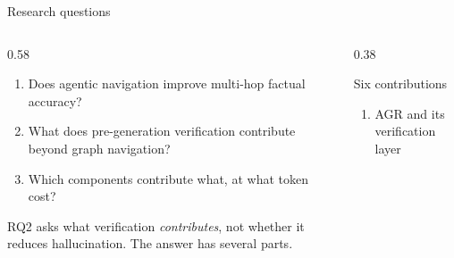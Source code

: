 \begin{frame}{Research questions}
  \bodyshift{2.75pt}
  \begin{columns}[T]
    \begin{column}{0.58\textwidth}
      \let\raggedright\agrraggedright
      \addtolength{\leftmargini}{\labelsep}%
      \begin{enumerate}
        \item[\textbf{RQ1}] Does agentic navigation improve
          \alert{multi-hop} factual accuracy?
          \vspace{1mm}
        \item[\textbf{RQ2}] What does pre-generation verification
          \alert{contribute} beyond graph navigation?
          \vspace{1mm}
        \item[\textbf{RQ3}] Which components contribute what, at what
          \alert{token cost}?
      \end{enumerate}
      \vspace{1mm}
      {\small\agrraggedright RQ2 asks what verification
      \emph{contributes}, not whether it reduces hallucination. The answer
      has several parts.\par}
    \end{column}
    \begin{column}{0.38\textwidth}
      \let\raggedright\agrraggedright
      \begin{block}{Six contributions}
        \small
        \begin{enumerate}\setlength{\itemsep}{0pt}
          \item AGR and its verification layer

\end{enumerate}
\end{block}
\end{column}
\end{columns}
\end{frame}
